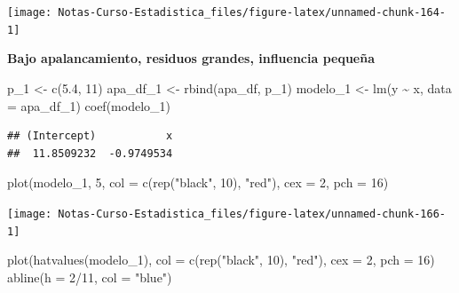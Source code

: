 \documentclass[
  12pt,
]{book}
\newenvironment{Shaded}{\begin{snugshade}}{\end{snugshade}}
\newcommand{\AttributeTok}[1]{\textcolor[rgb]{0.77,0.63,0.00}{#1}}
\newcommand{\DecValTok}[1]{\textcolor[rgb]{0.00,0.00,0.81}{#1}}
\newcommand{\FloatTok}[1]{\textcolor[rgb]{0.00,0.00,0.81}{#1}}
\newcommand{\FunctionTok}[1]{\textcolor[rgb]{0.00,0.00,0.00}{#1}}
\newcommand{\NormalTok}[1]{#1}
\newcommand{\OtherTok}[1]{\textcolor[rgb]{0.56,0.35,0.01}{#1}}
\newcommand{\SpecialCharTok}[1]{\textcolor[rgb]{0.00,0.00,0.00}{#1}}
\newcommand{\StringTok}[1]{\textcolor[rgb]{0.31,0.60,0.02}{#1}}
\theoremstyle{definition}
\theoremstyle{definition}
\theoremstyle{definition}
\theoremstyle{definition}
\theoremstyle{remark}
\begin{document}
\begin{center}\texttt{[image: Notas-Curso-Estadistica\_files/figure-latex/unnamed-chunk-164-1]} \end{center}

\textbf{Bajo apalancamiento, residuos grandes, influencia pequeña}

\begin{Shaded}
\begin{Highlighting}[]
\NormalTok{p\_1 }\OtherTok{\textless{}{-}} \FunctionTok{c}\NormalTok{(}\FloatTok{5.4}\NormalTok{, }\DecValTok{11}\NormalTok{)}
\NormalTok{apa\_df\_1 }\OtherTok{\textless{}{-}} \FunctionTok{rbind}\NormalTok{(apa\_df, p\_1)}
\NormalTok{modelo\_1 }\OtherTok{\textless{}{-}} \FunctionTok{lm}\NormalTok{(y }\SpecialCharTok{\textasciitilde{}}\NormalTok{ x, }\AttributeTok{data =}\NormalTok{ apa\_df\_1)}
\FunctionTok{coef}\NormalTok{(modelo\_1)}
\end{Highlighting}
\end{Shaded}

\begin{verbatim}
## (Intercept)           x 
##  11.8509232  -0.9749534
\end{verbatim}

\begin{Shaded}
\begin{Highlighting}[]
\FunctionTok{plot}\NormalTok{(modelo\_1, }\DecValTok{5}\NormalTok{, }\AttributeTok{col =} \FunctionTok{c}\NormalTok{(}\FunctionTok{rep}\NormalTok{(}\StringTok{"black"}\NormalTok{, }\DecValTok{10}\NormalTok{), }\StringTok{"red"}\NormalTok{),}
    \AttributeTok{cex =} \DecValTok{2}\NormalTok{, }\AttributeTok{pch =} \DecValTok{16}\NormalTok{)}
\end{Highlighting}
\end{Shaded}

\begin{center}\texttt{[image: Notas-Curso-Estadistica\_files/figure-latex/unnamed-chunk-166-1]} \end{center}

\begin{Shaded}
\begin{Highlighting}[]
\FunctionTok{plot}\NormalTok{(}\FunctionTok{hatvalues}\NormalTok{(modelo\_1), }\AttributeTok{col =} \FunctionTok{c}\NormalTok{(}\FunctionTok{rep}\NormalTok{(}\StringTok{"black"}\NormalTok{, }\DecValTok{10}\NormalTok{),}
    \StringTok{"red"}\NormalTok{), }\AttributeTok{cex =} \DecValTok{2}\NormalTok{, }\AttributeTok{pch =} \DecValTok{16}\NormalTok{)}
\FunctionTok{abline}\NormalTok{(}\AttributeTok{h =} \DecValTok{2}\SpecialCharTok{/}\DecValTok{11}\NormalTok{, }\AttributeTok{col =} \StringTok{"blue"}\NormalTok{)}
\end{Highlighting}
\end{Shaded}
\end{document}

